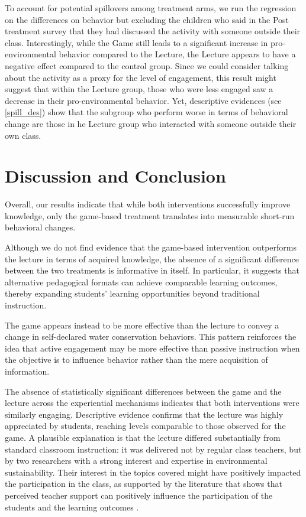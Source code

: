 \documentclass[preprint,12pt]{elsarticle}
\begin{document}


To account for potential spillovers among treatment arms, we run the regression on the differences on behavior but excluding the children who said in the Post treatment survey that they had discussed the activity with someone outside their class. Interestingly, while the Game still leads to a significant increase in pro-environmental behavior compared to the Lecture, the Lecture appears to have a negative effect compared to the control group. Since we could consider talking about the activity as a proxy for the level of engagement, this result might suggest that within the Lecture group, those who were less engaged saw a decrease in their pro-environmental behavior. Yet, descriptive evidences (see \ref{spill_des}) show that the subgroup who perform worse in terms of behavioral change are those in he Lecture group who interacted with someone outside their own class.


\section{Discussion and Conclusion}
\label{Disc}
Overall, our results indicate that while both interventions successfully improve knowledge, only the game-based treatment translates into measurable short-run behavioral changes.

Although we do not find evidence that the game-based intervention outperforms the lecture in terms of acquired knowledge, the absence of a significant difference between the two treatments is informative in itself. In particular, it suggests that alternative pedagogical formats can achieve comparable learning outcomes, thereby expanding students’ learning opportunities beyond traditional instruction.

The game appears instead to be more effective than the lecture to convey a change in self-declared water conservation behaviors. This pattern reinforces the idea that active engagement may be more effective than passive instruction when the objective is to influence behavior rather than the mere acquisition of information.

The absence of statistically significant differences between the game and the lecture across the experiential mechanisms indicates that both interventions were similarly engaging. Descriptive evidence confirms that the lecture was highly appreciated by students, reaching levels comparable to those observed for the game. A plausible explanation is that the lecture differed substantially from standard classroom instruction: it was delivered not by regular class teachers, but by two researchers with a strong interest and expertise in environmental sustainability.  Their interest in the topics covered might have positively impacted the participation in the class, as supported by the literature that shows that perceived teacher support can positively influence the participation of the students and the learning outcomes \cite{zhang2025relationship, strati2017perceived}.
\end{document}
